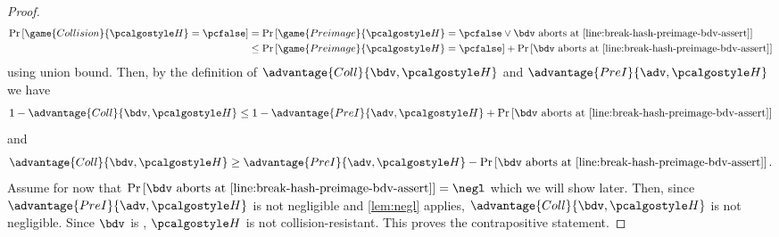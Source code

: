 \begin{proof}
  \begin{align*}
  \pr{\game{Collision}{\algo{H}} = \pcfalse} &= \pr{\game{Preimage}{\algo{H}} = \pcfalse \vee \bdv \text{ aborts at \cref{line:break-hash-preimage-bdv-assert}} } \\
  &\le \pr{\game{Preimage}{\algo{H}} = \pcfalse} + \pr{\bdv \text{ aborts at \cref{line:break-hash-preimage-bdv-assert}} } \\
  \end{align*}
  using union bound.
  Then, by the definition of $\advantage{Coll}{\bdv, \algo{H}}$ and $\advantage{PreI}{\adv, \algo{H}}$ we have
  \begin{align*}
    1 - \advantage{Coll}{\bdv, \algo{H}} &\le 1 - \advantage{PreI}{\adv, \algo{H}} + \pr{\bdv \text{ aborts at \cref{line:break-hash-preimage-bdv-assert}} }\\
  \end{align*}
  and
  \begin{align*}
    \advantage{Coll}{\bdv, \algo{H}} &\ge \advantage{PreI}{\adv, \algo{H}} - \pr{\bdv \text{ aborts at \cref{line:break-hash-preimage-bdv-assert}} }.\\
  \end{align*}
  Assume for now that $\pr{\bdv \text{ aborts at \cref{line:break-hash-preimage-bdv-assert}} } = \negl$ which we will show later.
  Then, since $\advantage{PreI}{\adv, \algo{H}}$ is not negligible and \cref{lem:negl} applies,
  $\advantage{Coll}{\bdv, \algo{H}}$ is not negligible.
  Since $\bdv$ is \ppt, $\algo{H}$ is not collision-resistant.
  This proves the contrapositive statement.


\end{proof}

